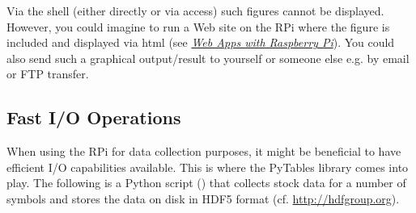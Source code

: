 \documentclass[letterpaper,10pt,english]{sphinxmanual}
\begin{document}
Via the shell (either directly or via  access) such figures cannot be displayed. However, you could imagine to run a Web site on the RPi where the figure is included and displayed via html (see {\hyperref[03_web_apps:web-apps]{\emph{Web Apps with Raspberry Pi}}}). You could also send such a graphical output/result to yourself or someone else e.g. by email or FTP transfer.


\subsection{Fast I/O Operations}
\label{02_data_analytics:fast-i-o-operations}
When using the RPi for data collection purposes, it might be beneficial to have efficient I/O capabilities available. This is where the PyTables library comes into play. The following is a Python script () that collects stock data for a number of symbols and stores the data on disk in HDF5 format (cf. \href{http://hdfgroup.org}{http://hdfgroup.org}).
\end{document}
